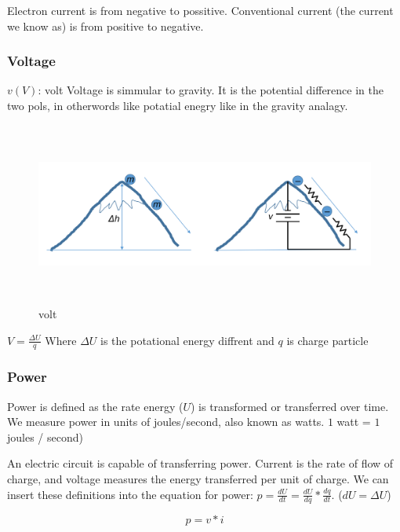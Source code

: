 \documentclass{article}
\begin{document}
Electron current is from negative to possitive. Conventional current (the current we know as) is from
positive to negative.

\subsubsection{Voltage}
$v (V)$: volt \newline
Voltage is simmular to gravity. It is the potential difference in the two pols, in otherwords
like potatial enegry like in the gravity analagy.

\begin{figure}[h]
    \vspace{10mm}
    \centering
    \includegraphics[width=15cm, height=6cm]{image/volt.png}
    \caption{volt}
\end{figure}

$V=\frac{\Delta{U}}{q}$ Where $\Delta{U}$ is the potational energy diffrent and $q$ is charge particle

\newpage
\subsubsection{Power}
Power is defined as the rate energy ($U$) is transformed or transferred over time. We measure power in units of joules/second, also known as watts.
$1$ watt = $1$ joules / second) \newline

An electric circuit is capable of transferring power. Current is the rate of flow of charge, and voltage measures the energy transferred per unit of charge. We can insert these definitions into the equation for power:
$p = \frac{dU}{dt} = \frac{dU}{dq} * \frac{dq}{dt}$. ($dU=\Delta{U}$)

\begin{equation} p = v*i \end{equation}
\end{document}
